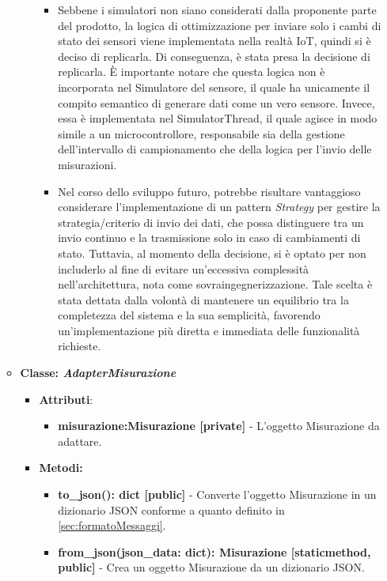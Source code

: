 \begin{itemize}
\begin{itemize}
\begin{itemize}
\begin{itemize}
            \item Sebbene i simulatori non siano considerati dalla proponente parte del prodotto, la logica di ottimizzazione per inviare solo i cambi di stato dei sensori viene implementata nella realtà IoT, quindi si è deciso di replicarla. Di conseguenza, è stata presa la decisione di replicarla. È importante notare che questa logica non è incorporata nel Simulatore del sensore, il quale ha unicamente il compito semantico di generare dati come un vero sensore. Invece, essa è implementata nel SimulatorThread, il quale agisce in modo simile a un microcontrollore, responsabile sia della gestione dell'intervallo di campionamento che della logica per l'invio delle misurazioni.
            \item Nel corso dello sviluppo futuro, potrebbe risultare vantaggioso considerare l'implementazione di un pattern \textit{Strategy} per gestire la strategia/criterio di invio dei dati, che possa distinguere tra un invio continuo e la trasmissione solo in caso di cambiamenti di stato. Tuttavia, al momento della decisione, si è optato per non includerlo al fine di evitare un'eccessiva complessità nell'architettura, nota come sovraingegnerizzazione. Tale scelta è stata dettata dalla volontà di mantenere un equilibrio tra la completezza del sistema e la sua semplicità, favorendo un'implementazione più diretta e immediata delle funzionalità richieste.
        \end{itemize}
    \end{itemize}
    \item{\textbf{Classe: \textit{AdapterMisurazione}}}
    \begin{itemize}
    \item\textbf{Attributi}:
        \begin{itemize}
        \item \textbf{misurazione:Misurazione [private]} - L'oggetto Misurazione da adattare.
    \end{itemize}
    \item \textbf{Metodi: }
    \begin{itemize}
        \item \textbf{to\_json(): dict [public]} - Converte l'oggetto Misurazione in un dizionario JSON conforme a quanto definito in \ref{sec:formatoMessaggi}.
        \item \textbf{from\_json(json\_data: dict): Misurazione [staticmethod, public]} - Crea un oggetto Misurazione da un dizionario JSON.
    \end{itemize}

\end{itemize}
\end{itemize}
\end{itemize}
